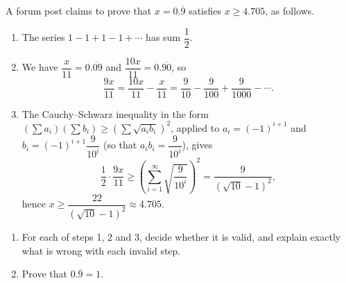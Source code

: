 A forum post claims to prove that $x=0.\overline{9}$ satisfies $x\ge4.705$, as follows.
\begin{enumerate}
\item[1.] The series $1-1+1-1+\cdots$ has sum $\dfrac12$.
\item[2.] We have $\dfrac{x}{11}=0.\overline{09}$ and $\dfrac{10x}{11}=0.\overline{90}$, so
\[\dfrac{9x}{11}=\dfrac{10x}{11}-\dfrac{x}{11}=\dfrac{9}{10}-\dfrac{9}{100}+\dfrac{9}{1000}-\cdots.\]
\item[3.] The Cauchy--Schwarz inequality in the form $\left(\sum a_i\right)\left(\sum b_i\right)\ge\left(\sum\sqrt{a_ib_i}\right)^2$, applied to $a_i=(-1)^{i+1}$ and $b_i=(-1)^{i+1}\dfrac{9}{10^i}$ (so that $a_ib_i=\dfrac{9}{10^i}$), gives
\[\dfrac12\cdot\dfrac{9x}{11}\ge\left(\sum_{i=1}^{\infty}\sqrt{\dfrac{9}{10^i}}\right)^2=\dfrac{9}{\left(\sqrt{10}-1\right)^2},\]
hence $x\ge\dfrac{22}{\left(\sqrt{10}-1\right)^2}\approx4.705$.
\end{enumerate}
\begin{enumerate}
\item[(a)] For each of steps 1, 2 and 3, decide whether it is valid, and explain exactly what is wrong with each invalid step.
\item[(b)] Prove that $0.\overline{9}=1$.
\end{enumerate}

